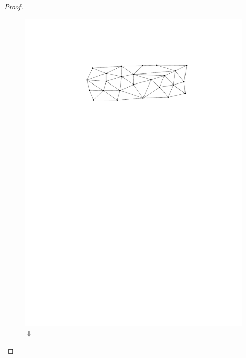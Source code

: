 \documentclass{article}
\theoremstyle{definition}
\begin{document}
\begin{proof}
    \begin{figure}
        \centering
        \includegraphics[page=3]{figs/proper_good}\\
        $\Downarrow$ \\

\end{figure}
\end{proof}
\end{document}
